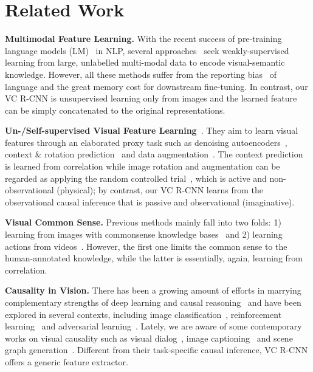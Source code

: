\documentclass[10pt,twocolumn,letterpaper]{article}
\begin{document}
 \section{Related Work}


\noindent\textbf{Multimodal Feature Learning.}
With the recent success of pre-training language models (LM)~\cite{devlin2018bert, dai-etal-2019-transformer, peters2018deep} in NLP, several approaches~\cite{lu2019vilbert,sun2019videobert, tan2019lxmert,chen2019uniter} seek weakly-supervised learning from large, unlabelled multi-modal data to encode visual-semantic knowledge.
However, all these methods suffer from the reporting bias~\cite{vedantam2015learning,lin2015don} of language and the great memory cost for downstream fine-tuning. 
In contrast, our VC R-CNN is unsupervised learning only from images and the learned feature can be simply concatenated to the original representations.


\noindent\textbf{Un-/Self-supervised Visual Feature Learning}~\cite{domke2008killed,theis2015generative,malisiewicz2009beyond, kolesnikov2019revisiting, zhai2019s4l}. They aim to learn visual features through an elaborated proxy task such as denoising autoencoders~\cite{bengio2014deep,vincent2008extracting}, context \& rotation prediction~\cite{doersch2015unsupervised, gidaris2018unsupervised} and data augmentation~\cite{lee2019rethinking}. The context prediction is learned from correlation while image rotation and augmentation can be regarded as applying the random controlled trial~\cite{pearl2018book}, which is active and non-observational (physical); by contrast, our VC R-CNN learns from the observational causal inference that is passive and observational (imaginative).


\noindent\textbf{Visual Common Sense.}
Previous methods mainly fall into two folds: 1) learning from images with commonsense knowledge bases~\cite{vedantam2015learning, yatskar2016stating, sadeghi2015viske, su2018learning,wu2016ask,zhu2014reasoning} and 2) learning actions from videos~\cite{goyal2017something}.
However, the first one limits the common sense to the human-annotated knowledge, while the latter is essentially, again, learning from correlation.


\noindent\textbf{Causality in Vision.}
There has been a growing amount of efforts in marrying complementary strengths of deep learning and causal reasoning~\cite{pearl2016causal, pearl2014interpretation} and have been explored in several contexts, including image classification~\cite{chalupka2014visual,lopez2017discovering}, reinforcement learning~\cite{nair2019causal, dasgupta2019causal,bengio2019meta} and adversarial learning~\cite{kocaoglu2017causalgan,kalainathan2018sam}. Lately, we are aware of some contemporary works on visual causality such as visual dialog~\cite{qi2019two}, image captioning~\cite{yang2020deconfounded} and scene graph generation~\cite{tang2020unbiased}. Different from their task-specific causal inference, VC R-CNN offers a generic feature extractor. 
\end{document}
